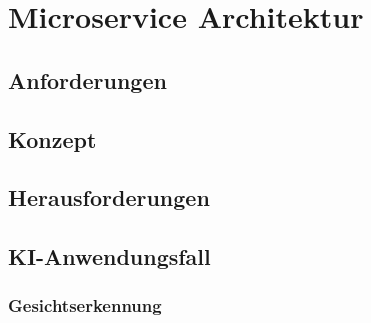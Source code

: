 \chapter{Microservice Architektur}
\section{Anforderungen}
\section{Konzept}
\section{Herausforderungen}
\section{KI-Anwendungsfall}
\subsection{Gesichtserkennung}